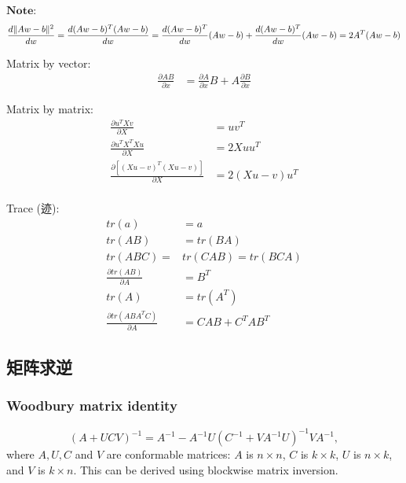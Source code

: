 \documentclass[11pt,a4paper]{article}
\begin{document}
$\textbf{Note:}$ $$\frac{d\|Aw-b\|^2}{dw}
=\frac{d(Aw-b)^T(Aw-b)}{dw}
\\=\frac{d(Aw-b)^T}{dw}(Aw-b)+\frac{d(Aw-b)^T}{dw}(Aw-b)
\\=2A^T(Aw-b)$$

Matrix by vector:
\begin{equation}
    \begin{aligned}
        \frac{\partial AB}{\partial x}&=\frac{\partial A}{\partial x}B+A\frac{\partial B}{\partial x}
    \end{aligned}
    \nonumber
\end{equation}

Matrix by matrix:
\begin{equation}
    \begin{aligned}
        \frac{\partial u^TXv}{\partial X}&=uv^T\\
        \frac{\partial u^TX^TXu}{\partial X}&=2Xuu^T\\
        \frac{\partial [(Xu-v)^T(Xu-v)]}{\partial X}&=2(Xu-v)u^T\\
    \end{aligned}
    \nonumber
\end{equation}

Trace (迹):
\begin{equation}
    \begin{aligned}
        tr(a)&=a\\
        tr(AB)&=tr(BA)\\
        tr(ABC)=&tr(CAB)=tr(BCA)\\
        \frac{\partial tr(AB)}{\partial A}&=B^T\\
        tr(A)&=tr(A^T)\\
        \frac{\partial tr(ABA^TC)}{\partial A}&=CAB+C^TAB^T
    \end{aligned}
    \nonumber
\end{equation}

\subsection{矩阵求逆}
\subsubsection{Woodbury matrix identity}
$${\displaystyle \left(A+UCV\right)^{-1}=A^{-1}-A^{-1}U\left(C^{-1}+VA^{-1}U\right)^{-1}VA^{-1},}$$
where $A, U, C$ and $V$ are conformable matrices: $A$ is $n\times n$, $C$ is $k\times k$, $U$ is $n\times k$, and $V$ is $k\times n$. This can be derived using blockwise matrix inversion.
\end{document}
